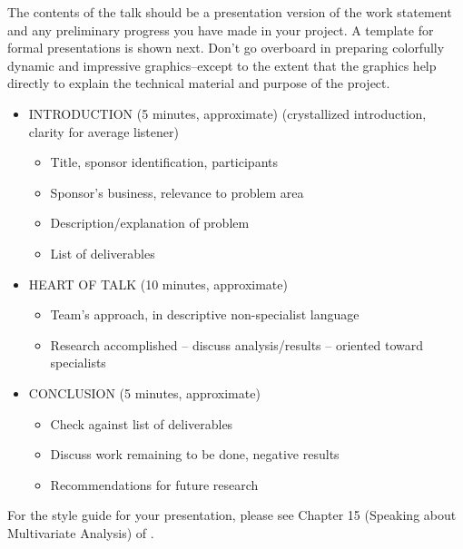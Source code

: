 \documentclass[12pt]{article}
\begin{document}
The contents of the talk should be a presentation
version of the work statement and any preliminary 
progress you have made in your project. A template for formal
presentations is shown next. Don't go overboard
in preparing colorfully dynamic and impressive graphics--except to the
extent that the graphics help directly to explain the technical
material and purpose of the project. 
\begin{itemize}
\item INTRODUCTION (5 minutes, approximate) (crystallized
  introduction, clarity for average listener)
\begin{itemize}
\item Title, sponsor identification, participants
\item Sponsor's business, relevance to problem area
\item Description/explanation of problem
\item List of deliverables
\end{itemize}
\item HEART OF TALK (10 minutes, approximate)
\begin{itemize}
\item Team's approach, in descriptive non-specialist language
\item Research accomplished -- discuss analysis/results -- oriented toward
specialists
\end{itemize}
\item CONCLUSION (5 minutes, approximate)
\begin{itemize}
\item Check against list of deliverables
\item Discuss work remaining to be done, negative results
\item Recommendations for future research
\end{itemize}
\end{itemize}

For the style guide for your presentation, please see 
Chapter 15 (Speaking about Multivariate Analysis) of \cite{WMA2005}.


\nocite{*}

\end{document}
